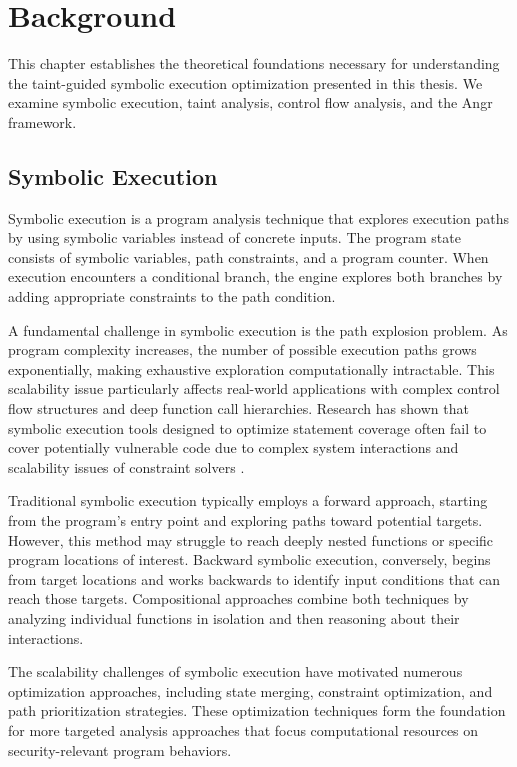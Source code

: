 \chapter{Background}

This chapter establishes the theoretical foundations necessary for understanding the taint-guided symbolic execution optimization presented in this thesis. We examine symbolic execution, taint analysis, control flow analysis, and the Angr framework.

\section{Symbolic Execution}

Symbolic execution is a program analysis technique that explores execution paths by using symbolic variables instead of concrete inputs. The program state consists of symbolic variables, path constraints, and a program counter. When execution encounters a conditional branch, the engine explores both branches by adding appropriate constraints to the path condition.

A fundamental challenge in symbolic execution is the path explosion problem. As program complexity increases, the number of possible execution paths grows exponentially, making exhaustive exploration computationally intractable. This scalability issue particularly affects real-world applications with complex control flow structures and deep function call hierarchies. Research has shown that symbolic execution tools designed to optimize statement coverage often fail to cover potentially vulnerable code due to complex system interactions and scalability issues of constraint solvers \cite{schwartz_all_2010}.

Traditional symbolic execution typically employs a forward approach, starting from the program's entry point and exploring paths toward potential targets. However, this method may struggle to reach deeply nested functions or specific program locations of interest. Backward symbolic execution, conversely, begins from target locations and works backwards to identify input conditions that can reach those targets. Compositional approaches combine both techniques by analyzing individual functions in isolation and then reasoning about their interactions.

The scalability challenges of symbolic execution have motivated numerous optimization approaches, including state merging, constraint optimization, and path prioritization strategies. These optimization techniques form the foundation for more targeted analysis approaches that focus computational resources on security-relevant program behaviors.

